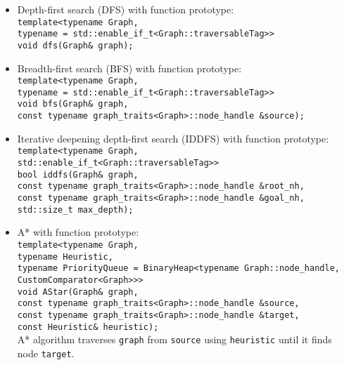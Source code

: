 \documentclass{article}
\begin{document}
\begin{itemize}
	\item Depth-first search (DFS) with function prototype:\\
		\texttt{template<typename Graph,\\\hspace*{4em}
				typename = std::enable\_if\_t<Graph::traversableTag>>\\
		void dfs(Graph\& graph);}
	\item Breadth-first search (BFS) with function prototype:\\
		\texttt{template<typename Graph,\\\hspace*{4em}
				typename = std::enable\_if\_t<Graph::traversableTag>>\\
		void bfs(Graph\& graph,\\\hspace*{2em}
		const typename graph\_traits<Graph>::node\_handle
				 \&source);}
	\item Iterative deepening depth-first search (IDDFS) with function prototype:\\
		\texttt{template<typename Graph,\\\hspace*{4em}
				std::enable\_if\_t<Graph::traversableTag>>\\
		bool iddfs(Graph\& graph,\\\hspace*{5em}
		const typename graph\_traits<Graph>::node\_handle \&root\_nh,\\\hspace*{5em}
		const typename graph\_traits<Graph>::node\_handle \&goal\_nh,\\\hspace*{5em}
		std::size\_t max\_depth);}
	\item A* with function prototype:\\
		\texttt{template<typename Graph,\\\hspace*{4.5em}typename
			Heuristic,\\\hspace*{4em}
			typename PriorityQueue = BinaryHeap<typename Graph::node\_handle,\\\hspace*{22em}
			CustomComparator<Graph>>>\\
			void AStar(Graph\& graph,\\\hspace*{5.27em}
			const typename graph\_traits<Graph>::node\_handle \&source,\\\hspace*{5.27em}
			const typename graph\_traits<Graph>::node\_handle \&target,\\\hspace*{5.27em}
			const Heuristic\& heuristic);}\\
		A* algorithm traverses \texttt{graph} from \texttt{source} using \texttt{heuristic} until it finds node \texttt{target}.
\end{itemize}
\end{document}
